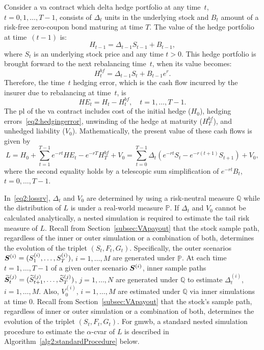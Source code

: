 Consider a \gls{va} contract which delta hedge portfolio at any time~$t$, $t=0,1,\ldots,T-1$, consists of $\Delta_t$ units in the underlying stock and $B_t$ amount of a risk-free zero-coupon bond maturing at time $T$.
The value of the hedge portfolio at time~$(t-1)$ is:
\begin{equation*}
    H_{t-1} = \Delta_{t-1} S_{t-1} + B_{t-1},
\end{equation*}
where $S_t$ is an underlying stock price and any time $t>0$.
This hedge portfolio is brought forward to the next rebalancing time~$t$, when its value becomes:
\begin{equation*}
    H_{t}^{bf} = \Delta_{t-1} S_{t} + B_{t-1}e^{r}.
\end{equation*}
Therefore, the time~$t$ hedging error, which is the cash flow incurred by the insurer due to rebalancing at time~$t$, is
\begin{equation}\label{eq2:hedgingerror}
    HE_t = H_t - H^{bf}_t, \quad t=1,\ldots, T-1.
\end{equation}
The \gls{pl} of the \gls{va} contract includes cost of the initial hedge ($H_0$), hedging errors~\eqref{eq2:hedgingerror}, unwinding of the hedge at maturity ($H^{bf}_T$), and unhedged liability ($V_0$).
Mathematically, the present value of these cash flows is given by
\begin{equation}\label{eq2:lossrv}
L = H_0 + \sum_{t=1}^{T-1} e^{-rt} HE_t - e^{-rT} H^{bf}_T + V_0 = \sum_{t=0}^{T-1}\Delta_t (e^{-rt}S_t - e^{-r(t+1)}S_{t+1}) + V_0,
\end{equation}
where the second equality holds by a telescopic sum simplification of $e^{-rt}B_t$, $t=0,\ldots,T-1$.

In~\eqref{eq2:lossrv}, $\Delta_t$ and $V_0$ are determined by using a risk-neutral measure $\mathbb{Q}$ while the distribution of $L$ is under a real-world measure $\mathbb{P}$.
If $\Delta_t$ and $V_0$ cannot be calculated analytically, a nested simulation is required to estimate the tail risk measure of $L$.
Recall from Section~\ref{subsec:VApayout} that the stock sample path, regardless of the inner or outer simulation or a combination of both, determines the evolution of the triplet $(S_t,F_t,G_t)$.
Specifically, the outer scenarios $\bm{S}^{(i)} = (S_{1}^{(i)},\ldots,S_{T}^{(i)})$, $i=1,\ldots,M$ are generated under $\mathbb{P}$.
At each time~$t=1,\ldots,T-1$ of a given outer scenario $\bm{S}^{(i)}$, inner sample paths $\widetilde{\bm{S}}_{t}^{(j)} = (\widetilde{S}_{t+1}^{(j)},\ldots,\widetilde{S}_{T}^{(j)})$, $j=1,\ldots,N$ are generated under $\mathbb{Q}$ to estimate $\Delta_t^{(i)}$, $i=1,\ldots,M$.
Also, $V_0^{(i)}$, $i=1,\ldots,M$ are estimated under $\mathbb{Q}$ via inner simulations at time $0$.
Recall from Section~\ref{subsec:VApayout} that the stock's sample path, regardless of inner or outer simulation or a combination of both, determines the evolution of the triplet $(S_t,F_t,G_t)$.
For \gls{gmwb}, a standard nested simulation procedure to estimate the $\alpha$-\gls{cvar} of $L$ is described in Algorithm~\ref{alg2:standardProcedure} below.

